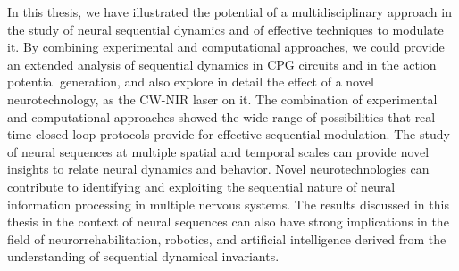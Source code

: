 In this thesis, we have illustrated the potential of a multidisciplinary approach in the study of neural sequential dynamics and of effective techniques to modulate it. By combining experimental and computational approaches, we could provide an extended analysis of sequential dynamics in CPG circuits and in the action potential generation, and also explore in detail the effect of a novel neurotechnology, as the CW-NIR laser on it. The combination of experimental and computational approaches showed the wide range of possibilities that real-time closed-loop protocols provide for effective sequential modulation. The study of neural sequences at multiple spatial and temporal scales can provide novel insights to relate neural dynamics and behavior. Novel neurotechnologies can contribute to identifying and exploiting the sequential nature of neural information processing in multiple nervous systems. The results discussed in this thesis in the context of neural sequences can also have strong implications in the field of neurorrehabilitation, robotics, and artificial intelligence derived from the understanding of sequential dynamical invariants. 




